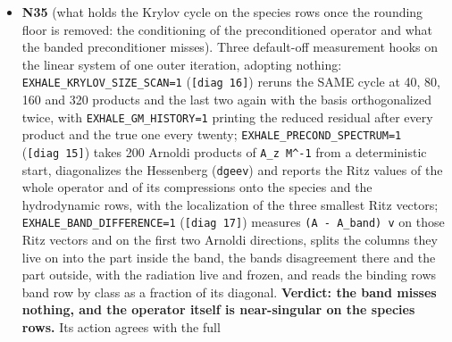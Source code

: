 \documentclass[english,a4paper]{my_memo}
\begin{document}
\begin{itemize}
  hydrodynamic rows and are untouched by any of it. Advisor: rebuild on \texttt{build\_lwv} (the new \texttt{hydrodynamic\_rows.f90} in \texttt{SRC}); \texttt{krylov\_and\_dogleg} 232/0, \texttt{steady\_species\_rows} 194/0, \texttt{energy\_update} 53/0; atomic reload at cap 40 with every hook off, 8 threads: the N31 ladder to the digit (7.607e-2 at 40, handed back 5.377e-2). The \texttt{caloric\_eos.f90} accessors (read-only, outside the brief\textquotesingle s list) accepted on the molecular reload\textquotesingle s bitwise evidence. Accepted; nothing adopted. Decision 23 restated with this result: option (b) retired as a remedy, (a) still the right discretization but not by itself the cure of the species-row solve; the atomic fixture README gained a 2026-09-10 state section (binding rows Fe of cells 132 to 137 at cap 250 on this tree). \textbf{Next item N35} (runs without a decision): the conditioning of the preconditioned operator on the element and carrier rows at the binding iterate, and what the banded preconditioner misses there.
\item
  \textbf{N35} (what holds the Krylov cycle on the species rows once the
  rounding floor is removed: the conditioning of the preconditioned
  operator and what the banded preconditioner misses). Three default-off
  measurement hooks on the linear system of one outer iteration, adopting
  nothing: \texttt{EXHALE\_KRYLOV\_SIZE\_SCAN=1} (\texttt{{[}diag\ 16{]}}) reruns the SAME cycle
  at 40, 80, 160 and 320 products and the last two again with the basis
  orthogonalized twice, with \texttt{EXHALE\_GM\_HISTORY=1} printing the reduced
  residual after every product and the true one every twenty;
  \texttt{EXHALE\_PRECOND\_SPECTRUM=1} (\texttt{{[}diag\ 15{]}}) takes 200 Arnoldi products of
  \texttt{A\_z\ M\^{}-1} from a deterministic start, diagonalizes the Hessenberg
  (\texttt{dgeev}) and reports the Ritz values of the whole operator and of its
  compressions onto the species and the hydrodynamic rows, with the
  localization of the three smallest Ritz vectors;
  \texttt{EXHALE\_BAND\_DIFFERENCE=1} (\texttt{{[}diag\ 17{]}}) measures \texttt{(A\ -\ A\_band)\ v} on
  those Ritz vectors and on the first two Arnoldi directions, splits the
  columns they live on into the part inside the band, the band\textquotesingle s
  disagreement there and the part outside, with the radiation live and
  frozen, and reads the binding row\textquotesingle s band row by class as a fraction of its
  diagonal. \textbf{Verdict: the band misses nothing, and the operator itself is
  near-singular on the species rows.} Its action agrees with the full

\end{itemize}
\end{document}
